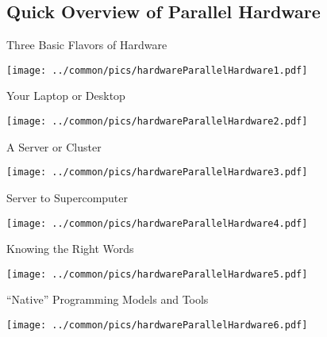 \subsection{Quick Overview of Parallel Hardware}

\begin{frame}
\begin{block}{Three Basic Flavors of Hardware}
    
\texttt{[image: 
../common/pics/hardwareParallelHardware1.pdf]}
\end{block}
\end{frame}

\begin{frame}
\begin{block}{Your Laptop or Desktop}
    
\texttt{[image: 
../common/pics/hardwareParallelHardware2.pdf]}
\end{block}
\end{frame}

\begin{frame}
\begin{block}{A Server or Cluster}
    
\texttt{[image: 
../common/pics/hardwareParallelHardware3.pdf]}
\end{block}
\end{frame}

\begin{frame}
\begin{block}{Server to Supercomputer}
    
\texttt{[image: 
../common/pics/hardwareParallelHardware4.pdf]}
\end{block}
\end{frame}

\begin{frame}
\begin{block}{Knowing the Right Words}
    
\texttt{[image: 
../common/pics/hardwareParallelHardware5.pdf]}
\end{block}
\end{frame}

\begin{frame}
\begin{block}{``Native'' Programming Models and Tools}
    
\texttt{[image: 
../common/pics/hardwareParallelHardware6.pdf]}
\end{block}
\end{frame}

